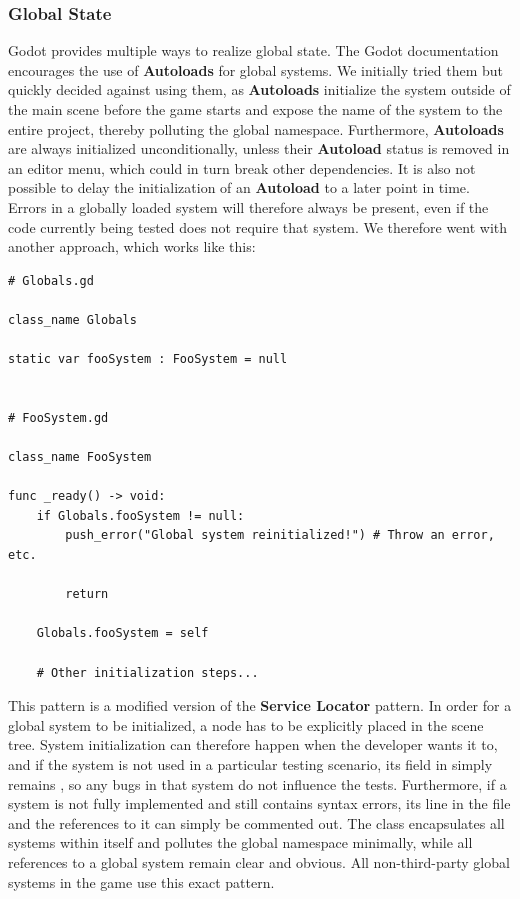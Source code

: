 \documentclass[../Main.tex]{subfiles}
\begin{document}
\subsubsection{Global State}\label{sec:global-state}

Godot provides multiple ways to realize global state. The Godot documentation encourages the use of \textbf{Autoloads} for global systems\autocite[]{godot_autoload}. We initially tried them but quickly decided against using them, as \textbf{Autoloads} initialize the system outside of the main scene before the game starts and expose the name of the system to the entire project, thereby polluting the global namespace. Furthermore, \textbf{Autoloads} are always initialized unconditionally, unless their \textbf{Autoload} status is removed in an editor menu, which could in turn break other dependencies. It is also not possible to delay the initialization of an \textbf{Autoload} to a later point in time. Errors in a globally loaded system will therefore always be present, even if the code currently being tested does not require that system. We therefore went with another approach, which works like this:

\begin{verbatim}
# Globals.gd

class_name Globals

static var fooSystem : FooSystem = null


# FooSystem.gd

class_name FooSystem

func _ready() -> void:
    if Globals.fooSystem != null:
        push_error("Global system reinitialized!") # Throw an error, etc.

        return
    
    Globals.fooSystem = self
    
    # Other initialization steps...
\end{verbatim}

This pattern is a modified version of the \textbf{Service Locator} pattern\autocite[]{nystrom_servicelocator}. In order for a global system to be initialized, a node has to be explicitly placed in the scene tree. System initialization can therefore happen when the developer wants it to, and if the system is not used in a particular testing scenario, its field in  simply remains , so any bugs in that system do not influence the tests. Furthermore, if a system is not fully implemented and still contains syntax errors, its line in the  file and the references to it can simply be commented out. The  class encapsulates all systems within itself and pollutes the global namespace minimally, while all references to a global system remain clear and obvious. All non-third-party global systems in the game use this exact pattern.
\end{document}
